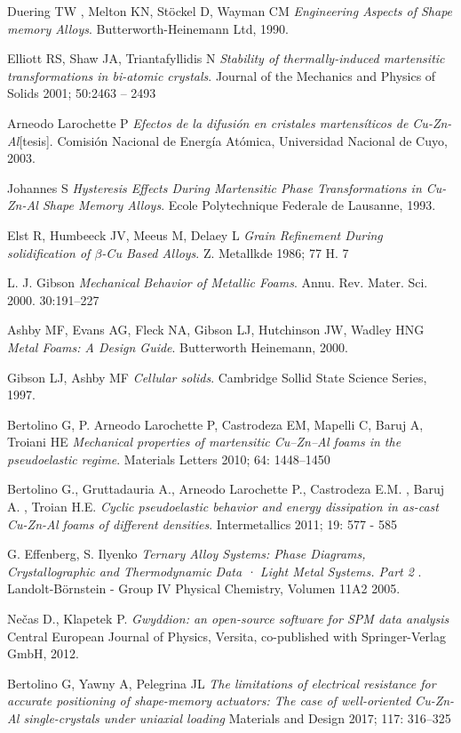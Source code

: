 \documentclass[a4paper,12pt,fleqn,twoside,openany]{book}
\begin{document}
\backmatter
\cleardoublepage
\begin{thebibliography}{3}

Duering TW , Melton KN, St{\"o}ckel D, Wayman CM
\textit{Engineering Aspects of Shape memory Alloys}. 
Butterworth-Heinemann Ltd, 1990.
 
Elliott RS, Shaw JA, Triantafyllidis N
\textit{Stability of thermally-induced martensitic
transformations in bi-atomic crystals}.
Journal of the Mechanics and Physics of Solids
2001; 50:2463 – 2493

Arneodo Larochette P
\textit{Efectos de la difusión en cristales martensíticos de Cu-Zn-Al}[tesis]. 
Comisión Nacional de Energía Atómica, Universidad Nacional de Cuyo, 2003.

Johannes S
\textit{Hysteresis Effects During Martensitic Phase Transformations in Cu-Zn-Al Shape Memory Alloys}. 
Ecole Polytechnique Federale de Lausanne, 1993.

Elst R, Humbeeck JV, Meeus M, Delaey L
\textit{Grain Refinement During solidification of $\beta$-Cu Based Alloys}.
Z. Metallkde 1986; 77 H. 7

L. J. Gibson
\textit{Mechanical Behavior of Metallic Foams}.
Annu. Rev. Mater. Sci. 2000. 30:191–227

Ashby MF, Evans AG, Fleck NA, Gibson LJ, Hutchinson JW, Wadley HNG
\textit{Metal Foams: A Design Guide}. 
Butterworth Heinemann, 2000.

Gibson LJ, Ashby MF
\textit{Cellular solids}. 
Cambridge Sollid State Science Series, 1997.

Bertolino G, P. Arneodo Larochette P, Castrodeza EM, Mapelli C, Baruj A, Troiani HE
\textit{Mechanical properties of martensitic Cu–Zn–Al foams in the pseudoelastic regime}.
Materials Letters 2010; 64: 1448–1450

Bertolino G., Gruttadauria  A., Arneodo Larochette P., Castrodeza E.M. , Baruj A. , Troian H.E.
\textit{Cyclic pseudoelastic behavior and energy dissipation in as-cast Cu-Zn-Al foams of
different densities}.
Intermetallics 2011; 19: 577 - 585

G. Effenberg, S. Ilyenko 
\textit{ Ternary Alloy Systems: Phase Diagrams, Crystallographic and Thermodynamic Data · Light Metal Systems. Part 2
}. 
Landolt-Börnstein - Group IV Physical Chemistry, Volumen 11A2 2005.

Nečas D., Klapetek P.
\textit{Gwyddion: an open-source software for {SPM} data analysis}
Central European Journal of Physics, Versita, co-published with Springer-Verlag GmbH, 2012.


Bertolino G, Yawny A, Pelegrina JL
\textit{The limitations of electrical resistance for accurate positioning of
shape-memory actuators: The case of well-oriented Cu-Zn-Al
single-crystals under uniaxial loading}
Materials and Design 2017; 117: 316–325
\end{thebibliography}
\end{document}
